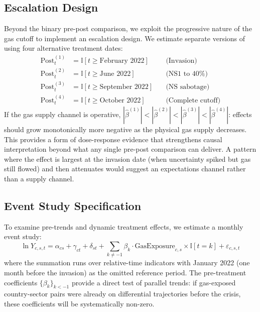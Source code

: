 \documentclass[12pt]{article}
\newcommand{\ind}{\mathbb{I}}
\begin{document}
\subsection{Escalation Design}

Beyond the binary pre-post comparison, we exploit the progressive nature of the gas cutoff to implement an escalation design. We estimate separate versions of  using four alternative treatment dates:
\begin{align}
    \text{Post}^{(1)}_t &= \ind[t \geq \text{February 2022}] \quad &\text{(Invasion)} \label{eq:post1} \\
    \text{Post}^{(2)}_t &= \ind[t \geq \text{June 2022}] \quad &\text{(NS1 to 40\%)} \label{eq:post2} \\
    \text{Post}^{(3)}_t &= \ind[t \geq \text{September 2022}] \quad &\text{(NS sabotage)} \label{eq:post3} \\
    \text{Post}^{(4)}_t &= \ind[t \geq \text{October 2022}] \quad &\text{(Complete cutoff)} \label{eq:post4}
\end{align}
If the gas supply channel is operative, $|\hat{\beta}^{(1)}| < |\hat{\beta}^{(2)}| < |\hat{\beta}^{(3)}| < |\hat{\beta}^{(4)}|$: effects should grow monotonically more negative as the physical gas supply decreases. This provides a form of dose-response evidence that strengthens causal interpretation beyond what any single pre-post comparison can deliver. A pattern where the effect is largest at the invasion date (when uncertainty spiked but gas still flowed) and then attenuates would suggest an expectations channel rather than a supply channel.

\subsection{Event Study Specification}

To examine pre-trends and dynamic treatment effects, we estimate a monthly event study:
\begin{equation}
\ln Y_{c,s,t} = \alpha_{cs} + \gamma_{ct} + \delta_{st} + \sum_{k \neq -1} \beta_k \cdot \text{GasExposure}_{c,s} \times \ind[t = k] + \varepsilon_{c,s,t}
\label{eq:event}
\end{equation}
where the summation runs over relative-time indicators with January 2022 (one month before the invasion) as the omitted reference period. The pre-treatment coefficients $\{\beta_k\}_{k < -1}$ provide a direct test of parallel trends: if gas-exposed country-sector pairs were already on differential trajectories before the crisis, these coefficients will be systematically non-zero.
\end{document}
